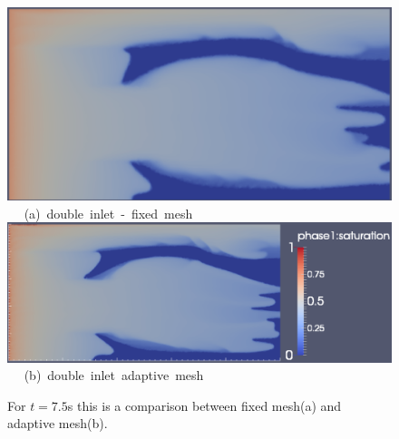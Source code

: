 \begin{landscape}
\begin{figure}[ht] 
\vbox{
\hbox{\hspace{3.5cm}
\includegraphics[width=.65\textwidth]{./Pics1/5reg_dinlet_fixed_1500.pdf} 
}
\vspace{0.0cm}
\hbox{\hspace{6.5cm} (a) double inlet - fixed mesh   
}
\hbox{\hspace{3.5cm}
\includegraphics[width=.9\textwidth]{./Pics1/5reg_dinlet_adapt_1500_1.pdf}
}
\vspace{0.0cm}
\hbox{\hspace{6.5cm} (b) double inlet adaptive mesh   
}
}     
\caption{For $t=7.5$s this is a comparison between fixed mesh(a) and adaptive mesh(b).}
\label{fig:3testcase_c}
\end{figure}
\end{landscape}
\clearpage

